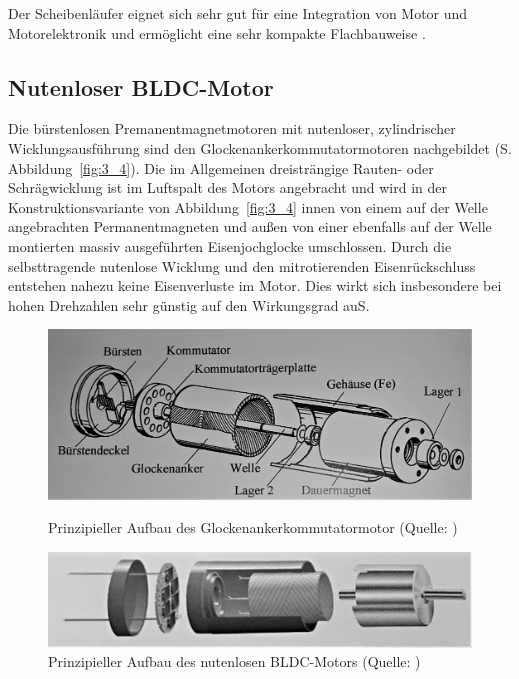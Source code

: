 Der Scheibenläufer eignet sich sehr gut für eine Integration von Motor und Motorelektronik und ermöglicht eine sehr kompakte Flachbauweise \parencite[S.  77--78]{Stölting2011}.

\subsection{Nutenloser BLDC-Motor}

Die bürstenlosen Premanentmagnetmotoren mit nutenloser, zylindrischer Wicklungsausführung sind den Glockenankerkommutatormotoren nachgebildet (S.  Abbildung~\ref{fig:3_4}). Die im Allgemeinen dreisträngige Rauten- oder Schrägwicklung ist im Luftspalt des Motors angebracht und wird in der Konstruktionsvariante von Abbildung~\ref{fig:3_4} innen von einem auf der Welle angebrachten Permanentmagneten und außen von einer ebenfalls auf der Welle montierten massiv ausgeführten Eisenjochglocke umschlossen. Durch die selbsttragende nutenlose Wicklung und den mitrotierenden Eisenrückschluss entstehen nahezu keine Eisenverluste im Motor. Dies wirkt sich insbesondere bei hohen Drehzahlen sehr günstig auf den Wirkungsgrad auS. 

\begin{figure}[h]
  \begin{minipage}{.48\linewidth}
    \centering
    \includegraphics[width=\textwidth]{./Grafiken/3_4}
    \caption[Prinzipieller Aufbau des Glockenankerkommutatormotor]{Prinzipieller Aufbau des Glockenankerkommutatormotor (Quelle: \parencite[S.  30]{Stölting2011})}%
    \label{fig:3_4}
  \end{minipage}\hfill%
  \begin{minipage}{.48\linewidth}
    \centering
    \includegraphics[width=\textwidth]{./Grafiken/3_5}
    \caption[Prinzipieller Aufbau des nutenlosen BLDC-Motors]{Prinzipieller Aufbau des nutenlosen BLDC-Motors (Quelle: \parencite[S.  78]{Stölting2011})}%
    \label{fig:3_5}
  \end{minipage}
\end{figure}


